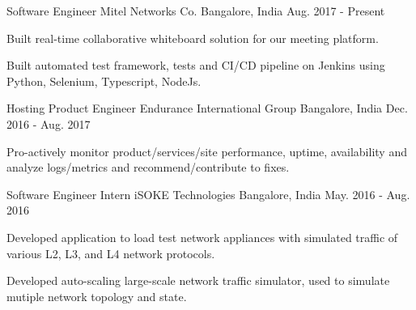 

\begin{cventries}

  \cventry
    {Software Engineer} %
    {Mitel Networks Co.} %
    {Bangalore, India} %
    {Aug. 2017 - Present} %
    {
      \begin{cvitems} %
        \item {Built real-time collaborative whiteboard solution for our meeting platform.}
        \item {Built automated test framework, tests and CI/CD pipeline on Jenkins using Python, Selenium, Typescript, NodeJs.}
      \end{cvitems}
    }

  \cventry
    {Hosting Product Engineer} %
    {Endurance International Group} %
    {Bangalore, India} %
    {Dec. 2016 - Aug. 2017} %
    {
      \begin{cvitems} %
        \item {Pro-actively monitor product/services/site performance, uptime, availability and analyze logs/metrics and recommend/contribute to fixes.}
      \end{cvitems}
    }

  \cventry
    {Software Engineer Intern} %
    {iSOKE Technologies } %
    {Bangalore, India} %
    {May. 2016 - Aug. 2016} %
    {
      \begin{cvitems} %
        \item {Developed application to load test network appliances with simulated traffic of various L2, L3, and L4 network protocols.}
        \item {Developed auto-scaling large-scale network traffic simulator, used to simulate mutiple network topology and state.}
      \end{cvitems}
    }
\end{cventries}
